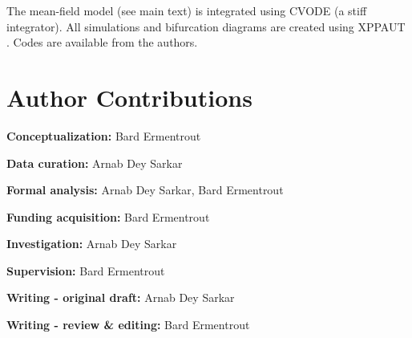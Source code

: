 \documentclass[10pt,letterpaper]{article}
\begin{document}
The mean-field model (see main text) is integrated using CVODE (a stiff integrator). All simulations and bifurcation diagrams are created using XPPAUT \cite{xppaut}. Codes are available from the authors.




\section*{Author Contributions}
\begin{description}
\item {\bf Conceptualization:} Bard Ermentrout
\item {\bf Data curation:} Arnab Dey Sarkar
\item {\bf Formal analysis:} Arnab Dey Sarkar, Bard Ermentrout
\item {\bf Funding acquisition:} Bard Ermentrout
\item {\bf Investigation:} Arnab Dey Sarkar  
\item {\bf Supervision:} Bard Ermentrout
\item {\bf Writing - original draft:} Arnab Dey Sarkar
\item {\bf Writing - review \& editing:} Bard Ermentrout  
\end{description}



\end{document}
